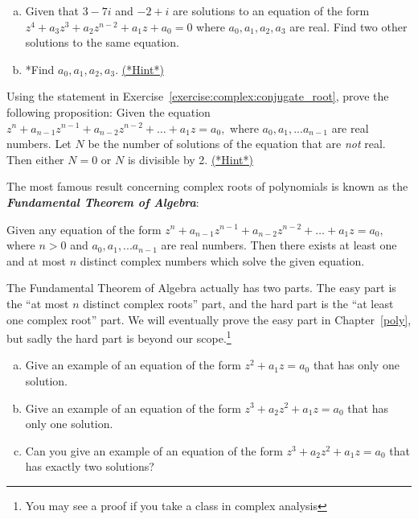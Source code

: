 {\begin{exercise}\label{exercise:complex:62} 
\begin{enumerate}[(a)]
\item
Given that $3 - 7i$ and $-2+i$ are solutions to an equation of the form $z^4 + a_{3}z^{3} + a_{2} z^{n-2}+ a_1 z + a_0 = 0$ where $a_0, a_1, a_2, a_3$ are real. Find two other solutions to the same equation.
\item
*Find $a_0, a_1, a_2, a_3$. 
\hyperref[sec:complex:hints]{(*Hint*)}
\end{enumerate}
\end{exercise}

\begin{exercise}\label{exercise:complex:conjugate_root2}
Using the statement in Exercise~\ref{exercise:complex:conjugate_root}, prove the following proposition:
Given the equation  $z^n + a_{n-1}z^{n-1} + a_{n-2} z^{n-2} + \ldots + a_1 z =a_0,$ where $a_0, a_1, ... a_{n-1}$ are real numbers. Let $N$ be the number of solutions of the equation that are \emph{not} real. Then either $N=0$ or $N$ is divisible by 2. 
\hyperref[sec:complex:hints]{(*Hint*)}
\end{exercise}

The most famous result concerning complex roots of polynomials is known as the {\bf \emph{Fundamental Theorem of Algebra}}:

\begin{prop}\label{proposition:complex:FTOA} Given any equation of the form $z^n + a_{n-1}z^{n-1} + a_{n-2} z^{n-2} + \ldots + a_1 z =a_0,$ where $n>0$ and $a_0, a_1, ... a_{n-1}$ are real numbers. Then there exists at least one and at most $n$ distinct complex numbers which solve the given equation. 
\end{prop}

The Fundamental Theorem of Algebra actually has two parts. The easy part is the ``at most $n$ distinct complex roots'' part, and the hard part is the ``at least one complex root'' part. We will eventually prove the easy part in Chapter~\ref{poly}, but sadly the hard part is beyond our scope.\footnote{You may see a proof if you take a class in complex analysis}

\begin{exercise}\label{exercise:complex:70}
\begin{enumerate}[(a)]
\item
Give an example of an equation of the form $z^2 + a_1z = a_0$ that has only one solution.
\item
Give an example of an equation of the form $z^3 + a_2z^2 + a_1 z = a_0$ that has only one solution.
\item
Can you give an example of an equation of the form $z^3 + a_2z^2 + a_1 z = a_0$ that has exactly two solutions?
\end{enumerate}
\end{exercise}

}
